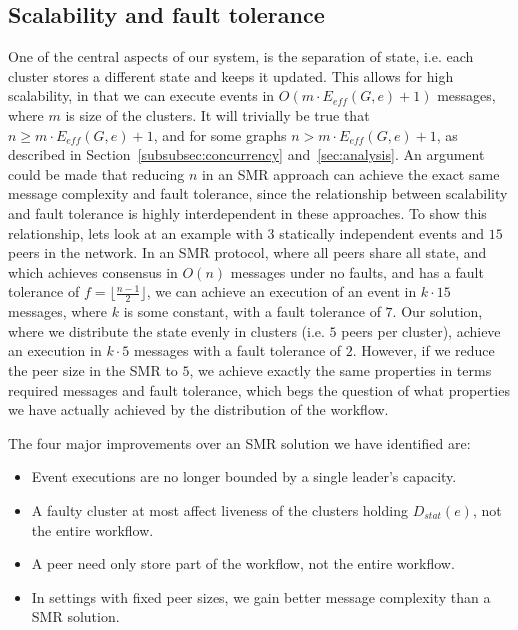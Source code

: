 \documentclass{article}
\begin{document}
	\subsection{Scalability and fault tolerance}
    One of the central aspects of our system, is the separation of state, i.e. each cluster stores a different state and keeps it updated.
   	This allows for high scalability, in that we can execute events in $O(m \cdot E_{eff}(G,e) + 1)$ messages, where $m$ is size of the clusters.
   	It will trivially be true that $n \geq m \cdot E_{eff}(G,e) + 1$, and for some graphs $n > m \cdot E_{eff}(G,e) + 1$, as described in Section~\ref{subsubsec:concurrency} and~\ref{sec:analysis}.
    An argument could be made that reducing $n$ in an SMR approach can achieve the exact same message complexity and fault tolerance, since the relationship between scalability and fault tolerance is highly interdependent in these approaches. 
    To show this relationship, lets look at an example with $3$ statically independent events and $15$ peers in the network. 
    In an SMR protocol, where all peers share all state, and which achieves consensus in $O(n)$ messages under no faults, and has a fault tolerance of $f = \lfloor \frac{n-1}{2} \rfloor$, we can achieve an execution of an event in $k \cdot 15$ messages, where $k$ is some constant, with a fault tolerance of $7$.
    Our solution, where we distribute the state evenly in clusters (i.e. $5$ peers per cluster), achieve an execution in $k \cdot 5$ messages with a fault tolerance of $2$.
    However, if we reduce the peer size in the SMR to $5$, we achieve exactly the same properties in terms required messages and fault tolerance, which begs the question of what properties we have actually achieved by the distribution of the workflow.

    The four major improvements over an SMR solution we have identified are:
    \begin{itemize}
    	\item Event executions are no longer bounded by a single leader's capacity.
    	\item A faulty cluster at most affect liveness of the clusters holding $D_{stat}(e)$, not the entire workflow.
    	\item A peer need only store part of the workflow, not the entire workflow.
    	\item In settings with fixed peer sizes, we gain better message complexity than a SMR solution.
    \end{itemize}
\end{document}
